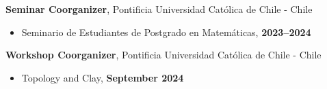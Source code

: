 \documentclass[margin,line]{res}
\begin{document}
\begin{resume}
{\bf Seminar Coorganizer}, Pontificia Universidad Católica de Chile - Chile
\vspace*{.05in}
\begin{itemize}
\item[]
  Seminario de Estudiantes de Postgrado en Matemáticas, \hfill {\bf 2023--2024}
\end{itemize}

{\bf Workshop Coorganizer}, Pontificia Universidad Católica de Chile - Chile
\vspace*{.05in}
\begin{itemize}
\item[]
  Topology and Clay, \hfill {\bf September 2024}
\end{itemize}









\end{resume}
\end{document}
